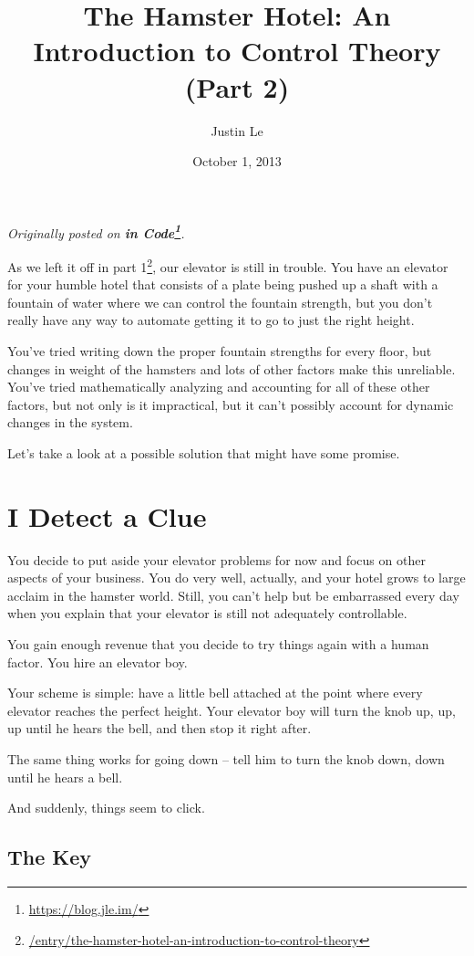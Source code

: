 \documentclass[]{article}
\title{The Hamster Hotel: An Introduction to Control Theory (Part 2)}
\author{Justin Le}
\date{October 1, 2013}
\renewcommand{\href}[2]{#2\footnote{\url{#1}}}
\begin{document}
\maketitle

\emph{Originally posted on \textbf{\href{https://blog.jle.im/}{in
Code}}.}

As we left it off in
\href{/entry/the-hamster-hotel-an-introduction-to-control-theory}{part
1}, our elevator is still in trouble. You have an elevator for your
humble hotel that consists of a plate being pushed up a shaft with a
fountain of water where we can control the fountain strength, but you
don't really have any way to automate getting it to go to just the right
height.

You've tried writing down the proper fountain strengths for every floor,
but changes in weight of the hamsters and lots of other factors make
this unreliable. You've tried mathematically analyzing and accounting
for all of these other factors, but not only is it impractical, but it
can't possibly account for dynamic changes in the system.

Let's take a look at a possible solution that might have some promise.

\section{I Detect a Clue}\label{i-detect-a-clue}

You decide to put aside your elevator problems for now and focus on
other aspects of your business. You do very well, actually, and your
hotel grows to large acclaim in the hamster world. Still, you can't help
but be embarrassed every day when you explain that your elevator is
still not adequately controllable.

You gain enough revenue that you decide to try things again with a human
factor. You hire an elevator boy.

Your scheme is simple: have a little bell attached at the point where
every elevator reaches the perfect height. Your elevator boy will turn
the knob up, up, up until he hears the bell, and then stop it right
after.

The same thing works for going down -- tell him to turn the knob down,
down until he hears a bell.

And suddenly, things seem to click.

\subsection{The Key}\label{the-key}
\end{document}
